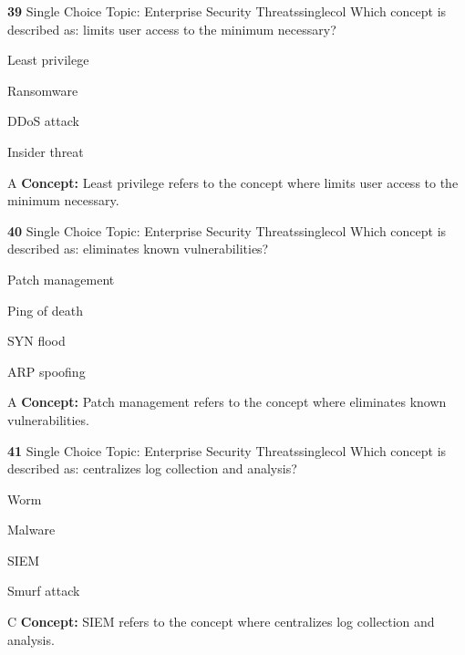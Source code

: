 \documentclass[10pt,a4paper]{article}
\begin{document}
\begin{qcard}{\color{white}\textbf{39} \hfill \small Single Choice \textbar{} Topic: Enterprise Security Threats}{singlecol}
Which concept is described as: limits user access to the minimum necessary?

\begin{qoptions}
\item Least privilege
\item Ransomware
\item DDoS attack
\item Insider threat
\end{qoptions}
\begin{explainbox}{A}
\textbf{Concept:} Least privilege refers to the concept where limits user access to the minimum necessary.
\end{explainbox}
\end{qcard}

\begin{qcard}{\color{white}\textbf{40} \hfill \small Single Choice \textbar{} Topic: Enterprise Security Threats}{singlecol}
Which concept is described as: eliminates known vulnerabilities?

\begin{qoptions}
\item Patch management
\item Ping of death
\item SYN flood
\item ARP spoofing
\end{qoptions}
\begin{explainbox}{A}
\textbf{Concept:} Patch management refers to the concept where eliminates known vulnerabilities.
\end{explainbox}
\end{qcard}

\begin{qcard}{\color{white}\textbf{41} \hfill \small Single Choice \textbar{} Topic: Enterprise Security Threats}{singlecol}
Which concept is described as: centralizes log collection and analysis?

\begin{qoptions}
\item Worm
\item Malware
\item SIEM
\item Smurf attack
\end{qoptions}
\begin{explainbox}{C}
\textbf{Concept:} SIEM refers to the concept where centralizes log collection and analysis.
\end{explainbox}
\end{qcard}
\end{document}
